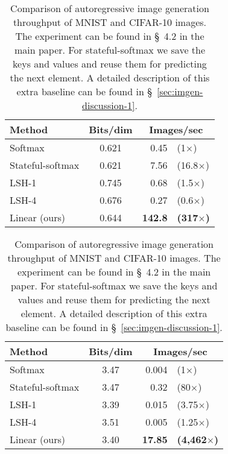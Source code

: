 \documentclass{article}
\begin{document}
\begin{table}
    \begin{subtable}[t]{0.5\textwidth}
        \begin{center}
        \begin{tabular}{lcrl}
            Method & Bits/dim & \multicolumn{2}{c}{Images/sec}\\
            \hline
            Softmax & 0.621 & 0.45 & (1$\times$) \\
            Stateful-softmax & 0.621 & 7.56 & (16.8$\times$) \\
            LSH-1 & 0.745 & 0.68 & (1.5$\times$) \\
            LSH-4 & 0.676 & 0.27 & (0.6$\times$) \\
            \hline
            Linear (ours) & 0.644 & \textbf{142.8} & \textbf{(317$\times$)}
        \end{tabular}
        \end{center}
        \caption{Image generation on MNIST}
        \label{tab:mnist-rnn}
    \end{subtable}
    \begin{subtable}[t]{0.5\textwidth}
        \begin{center}
        \begin{tabular}{lcrl}
            Method & Bits/dim & \multicolumn{2}{c}{Images/sec} \\
            \hline
            Softmax & 3.47 & 0.004 & (1$\times$) \\
            Stateful-softmax & 3.47 & 0.32 & (80$\times$) \\
            LSH-1 & 3.39 & 0.015  & (3.75$\times$) \\
            LSH-4 & 3.51 & 0.005  & (1.25$\times$) \\
            \hline
            Linear (ours) & 3.40 & \textbf{17.85} & \textbf{(4,462$\times$)}
        \end{tabular}
        \end{center}
        \caption{Image generation on CIFAR-10}
        \label{tab:cifar-rnn}
    \end{subtable}
    \caption{Comparison of autoregressive image generation throughput of MNIST
             and CIFAR-10 images. The experiment can be found in \S~4.2 in the
             main paper. For stateful-softmax we save the keys and values and
             reuse them for predicting the next element. A detailed description
             of this extra baseline can be found in
             \S~\ref{sec:imgen-discussion-1}.}
    \label{tab:rnn}
\end{table}
\end{document}
